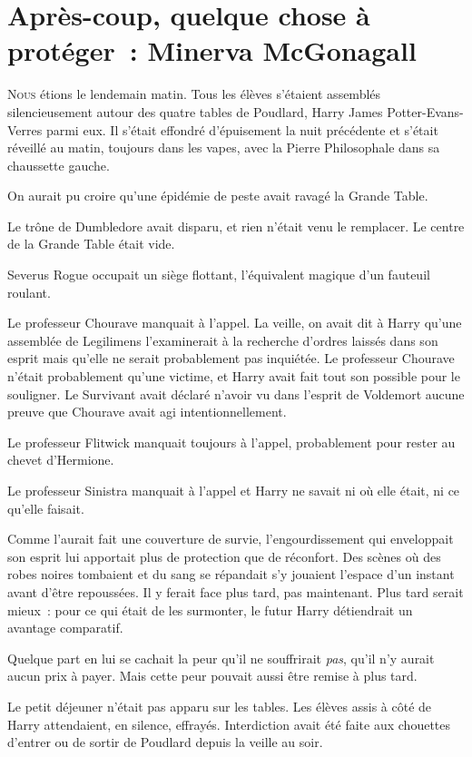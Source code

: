 \chapter{Après-coup, quelque chose à protéger~: Minerva McGonagall}

\lettrine{N}{ous} étions le lendemain matin. Tous les élèves s'étaient assemblés silencieusement autour des quatre tables de Poudlard, Harry James Potter-Evans-Verres parmi eux. Il s'était effondré d'épuisement la nuit précédente et s'était réveillé au matin, toujours dans les vapes, avec la Pierre Philosophale dans sa chaussette gauche.

On aurait pu croire qu'une épidémie de peste avait ravagé la Grande Table.

Le trône de Dumbledore avait disparu, et rien n'était venu le remplacer. Le centre de la Grande Table était vide.

Severus Rogue occupait un siège flottant, l'équivalent magique d'un fauteuil roulant.

Le professeur Chourave manquait à l'appel. La veille, on avait dit à Harry qu'une assemblée de Legilimens l'examinerait à la recherche d'ordres laissés dans son esprit mais qu'elle ne serait probablement pas inquiétée. Le professeur Chourave n'était probablement qu'une victime, et Harry avait fait tout son possible pour le souligner. Le Survivant avait déclaré n'avoir vu dans l'esprit de Voldemort aucune preuve que Chourave avait agi intentionnellement.

Le professeur Flitwick manquait toujours à l'appel, probablement pour rester au chevet d'Hermione.

Le professeur Sinistra manquait à l'appel et Harry ne savait ni où elle était, ni ce qu'elle faisait.

Comme l'aurait fait une couverture de survie, l'engourdissement qui enveloppait son esprit lui apportait plus de protection que de réconfort. Des scènes où des robes noires tombaient et du sang se répandait s'y jouaient l'espace d'un instant avant d'être repoussées. Il y ferait face plus tard, pas maintenant. Plus tard serait mieux~: pour ce qui était de les surmonter, le futur Harry détiendrait un avantage comparatif.

Quelque part en lui se cachait la peur qu'il ne souffrirait \emph{pas}, qu'il n'y aurait aucun prix à payer. Mais cette peur pouvait aussi être remise à plus tard.

Le petit déjeuner n'était pas apparu sur les tables. Les élèves assis à côté de Harry attendaient, en silence, effrayés. Interdiction avait été faite aux chouettes d'entrer ou de sortir de Poudlard depuis la veille au soir.

